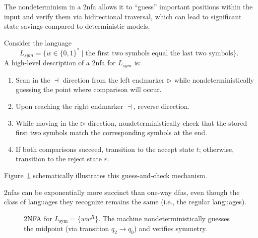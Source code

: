 \begin{remark}
The nondeterminism in a \gls{2nfa} allows it to “guess” important positions within the input and verify them via bidirectional traversal, which can lead to significant state savings compared to deterministic models.
\end{remark}

\begin{example}
Consider the language 
\[
L_{sym} = \{ w \in \{0,1\}^* \mid \text{the first two symbols equal the last two symbols} \}.
\]
A high-level description of a \gls{2nfa} for \(L_{sym}\) is:
\begin{enumerate}
    \item Scan in the \(\dashv\) direction from the left endmarker \(\triangleright\) while nondeterministically guessing the point where comparison will occur.
    \item Upon reaching the right endmarker \(\dashv\), reverse direction.
    \item While moving in the \(\triangleright\) direction, nondeterministically check that the stored first two symbols match the corresponding symbols at the end.
    \item If both comparisons succeed, transition to the accept state \(t\); otherwise, transition to the reject state \(r\).
\end{enumerate}
Figure~\ref{fig:2nfa-example} schematically illustrates this guess-and-check mechanism.
\end{example}

\begin{observation}
\glspl{2nfa} can be exponentially more succinct than one-way \glspl{dfa}, even though the class of languages they recognize remains the same (i.e., the regular languages).
\end{observation}

\begin{figure}[ht]
    \centering  
    \caption{2NFA for \(L_{\text{sym}} = \{ww^R\}\). The machine nondeterministically guesses the midpoint (via transition \(q_2 \to q_0\)) and verifies symmetry.}
    \label{fig:2nfa-example}
\end{figure}

